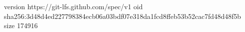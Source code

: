version https://git-lfs.github.com/spec/v1
oid sha256:3d48d4ed227798384ecb06a03bdf07e318da1fcd8ffeb53b52cac7fd48d48f5b
size 174916
